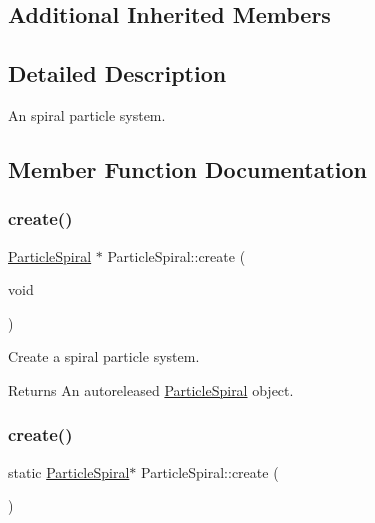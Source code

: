 \subsection*{Additional Inherited Members}


\subsection{Detailed Description}
An spiral particle system. 

\subsection{Member Function Documentation}
\mbox{\label{classParticleSpiral_a521efb3bd2e5960e518d8aabbeef077e}} 
\subsubsection{\texorpdfstring{create()}{create()}\hspace{0.1cm}{\footnotesize\ttfamily [1/2]}}
{\footnotesize\ttfamily \hyperlink{classParticleSpiral}{Particle\+Spiral} $\ast$ Particle\+Spiral\+::create (\begin{DoxyParamCaption}\item[{void}]{ }\end{DoxyParamCaption})\hspace{0.3cm}{\ttfamily [static]}}

Create a spiral particle system.

\begin{DoxyReturn}{Returns}
An autoreleased \hyperlink{classParticleSpiral}{Particle\+Spiral} object. 
\end{DoxyReturn}
\mbox{\label{classParticleSpiral_a9d7396d56d63a590a223f9ddd8f4649d}} 
\subsubsection{\texorpdfstring{create()}{create()}\hspace{0.1cm}{\footnotesize\ttfamily [2/2]}}
{\footnotesize\ttfamily static \hyperlink{classParticleSpiral}{Particle\+Spiral}$\ast$ Particle\+Spiral\+::create (\begin{DoxyParamCaption}{ }\end{DoxyParamCaption})\hspace{0.3cm}{\ttfamily [static]}}


